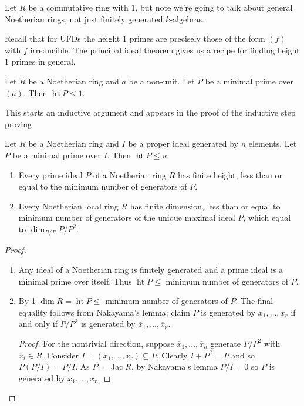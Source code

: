 \documentclass[a4paper]{article}
\DeclareMathOperator{\jac}{Jac} %
\DeclareMathOperator{\htt}{ht} %
\begin{document}
Let \(R\) be a commutative ring with \(1\), but note we're going to talk about general Noetherian rings, not just finitely generated \(k\)-algebras.

Recall that for UFDs the height \(1\) primes are precisely those of the form \((f)\) with \(f\) irreducible. The principal ideal theorem gives us a recipe for finding height \(1\) primes in general.

\begin{theorem}
  \label{thm:principal ideal theorem}
  Let \(R\) be a Noetherian ring and \(a\) be a non-unit. Let \(P\) be a minimal prime over \((a)\). Then \(\htt P \leq 1\).
\end{theorem}

This starts an inductive argument and appears in the proof of the inductive step proving

\begin{theorem}
  \label{thm:generalised principal ideal theorem}
  Let \(R\) be a Noetherian ring and \(I\) be a proper ideal generated by \(n\) elements. Let \(P\) be a minimal prime over \(I\). Then \(\htt P \leq n\).
\end{theorem}

\begin{corollary}\leavevmode
  \begin{enumerate}
  \item Every prime ideal \(P\) of a Noetherian ring \(R\) has finite height, less than or equal to the minimum number of generators of \(P\).
  \item Every Noetherian local ring \(R\) has finite dimension, less than or equal to minimum number of generators of the unique maximal ideal \(P\), which equal to \(\dim_{R/P} P/P^2\).
  \end{enumerate}
\end{corollary}

\begin{proof}\leavevmode
  \begin{enumerate}
  \item Any ideal of a Noetherian ring is finitely generated and a prime ideal is a minimal prime over itself. Thus \(\htt P \leq\) minimum number of generators of \(P\).
  \item By 1 \(\dim R = \htt P \leq\) minimum number of generators of \(P\). The final equality follows from Nakayama's lemma: claim \(P\) is generated by \(x_1, \dots, x_r\) if and only if \(P/P^2\) is generated by \(\overline x_1, \dots, \overline x_r\).

    \begin{proof}
      For the nontrivial direction, suppose \(\overline x_1, \dots, \overline x_n\) generate \(P/P^2\) with \(x_i \in R\). Consider \(I = (x_1, \dots, x_r) \subseteq P\). Clearly \(I + P^2 = P\) and so \(P (P/I) = P/I\). As \(P = \jac R\), by Nakayama's lemma \(P/I = 0\) so \(P\) is generated by \(x_1, \dots, x_r\).
    \end{proof}
  \end{enumerate}
\end{proof}
\end{document}
